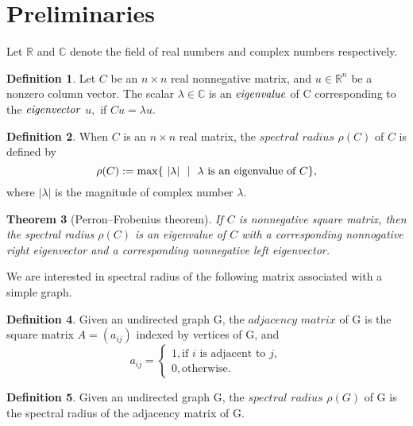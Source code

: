 \documentclass{article}
\theoremstyle{plain}
\newtheorem{thm}{Theorem}[subsection]
\theoremstyle{definition}
\newtheorem{defn}[thm]{Definition}
\begin{document}
\section{Preliminaries}
    
Let $\mathbb{R}$ and $\mathbb{C}$ denote the
 field of real numbers and complex numbers respectively.



\begin{defn}       
Let $C$ be an $n \times n$ real nonnegative matrix, and $u \in \mathbb{R}^n$ be a
 nonzero column vector. The scalar $\lambda \in \mathbb{C}$ is an $\it{eigenvalue}$ 
of C corresponding to the $\it{eigenvector}$ $u,$  if $Cu = \lambda u.$
        

\end{defn}


\begin{defn}
    When $C$ is an $n \times n$ real matrix, the $\textit {spectral radius} $ $\rho(C)$
        of $C$ is defined by 
        $$\rho(C):=\max\{~|\lambda|~\ |~~\lambda\hbox{ is an eigenvalue of $C$}\},$$
    where $|\lambda|$ is the magnitude of complex number $\lambda.$
\end{defn}

    

\begin{thm}[Perron–Frobenius theorem]\cite{chang}
    If $C$ is nonnegative square matrix, then the spectral radius $\rho(C)$ is an
    eigenvalue of $C$ with a corresponding nonnogative right eigenvector and a
    corresponding nonnegative left eigenvector.
\end{thm}

We are interested in spectral radius of the following matrix associated with a simple graph.

\begin{defn} 
    Given an undirected graph G, the$\textit{ adjacency matrix}$ of G is the square 
    matrix $A = (a_{ij})$ indexed by vertices of G, and
     \[a_{ij} =\begin{cases} 
        1, \text{if $i$ is adjacent to $j$}, \\
        0, \text{otherwise.}
            \end{cases}
     \]
\end{defn}
    
\begin{defn}
Given an undirected graph G, the $\textit{spectral radius}$  $\rho(G) $ of G is the spectral
 radius of the adjacency matrix of G.
\end{defn}
\end{document}
